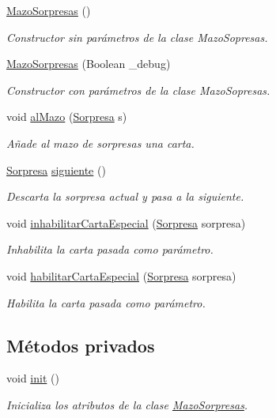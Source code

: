 \begin{DoxyCompactItemize}
\item 
\hyperlink{classcivitas_1_1MazoSorpresas_a2a54e95d3d74c8f73f922dc23554af9e}{Mazo\+Sorpresas} ()
\begin{DoxyCompactList}\small\item\em Constructor sin parámetros de la clase Mazo\+Sopresas. \end{DoxyCompactList}\item 
\hyperlink{classcivitas_1_1MazoSorpresas_a2768aba34debb139a79b22c6593e9acf}{Mazo\+Sorpresas} (Boolean \+\_\+debug)
\begin{DoxyCompactList}\small\item\em Constructor con parámetros de la clase Mazo\+Sopresas. \end{DoxyCompactList}\item 
void \hyperlink{classcivitas_1_1MazoSorpresas_a36fbdb305c6555817f1078dec430eddb}{al\+Mazo} (\hyperlink{classcivitas_1_1Sorpresa}{Sorpresa} s)
\begin{DoxyCompactList}\small\item\em Añade al mazo de sorpresas una carta. \end{DoxyCompactList}\item 
\hyperlink{classcivitas_1_1Sorpresa}{Sorpresa} \hyperlink{classcivitas_1_1MazoSorpresas_a667df8429be1bc4efa89b2d80ec92fa6}{siguiente} ()
\begin{DoxyCompactList}\small\item\em Descarta la sorpresa actual y pasa a la siguiente. \end{DoxyCompactList}\item 
void \hyperlink{classcivitas_1_1MazoSorpresas_a2f19b2fb1d7697611f22fd44dc81eed3}{inhabilitar\+Carta\+Especial} (\hyperlink{classcivitas_1_1Sorpresa}{Sorpresa} sorpresa)
\begin{DoxyCompactList}\small\item\em Inhabilita la carta pasada como parámetro. \end{DoxyCompactList}\item 
void \hyperlink{classcivitas_1_1MazoSorpresas_a285260ff3aab3eb49c41d4d274b9dcc1}{habilitar\+Carta\+Especial} (\hyperlink{classcivitas_1_1Sorpresa}{Sorpresa} sorpresa)
\begin{DoxyCompactList}\small\item\em Habilita la carta pasada como parámetro. \end{DoxyCompactList}\end{DoxyCompactItemize}
\subsection*{Métodos privados}
\begin{DoxyCompactItemize}
\item 
void \hyperlink{classcivitas_1_1MazoSorpresas_a8a5c58c8a162c9da0088678f3803c7dd}{init} ()
\begin{DoxyCompactList}\small\item\em Inicializa los atributos de la clase \hyperlink{classcivitas_1_1MazoSorpresas}{Mazo\+Sorpresas}. \end{DoxyCompactList}\end{DoxyCompactItemize}
